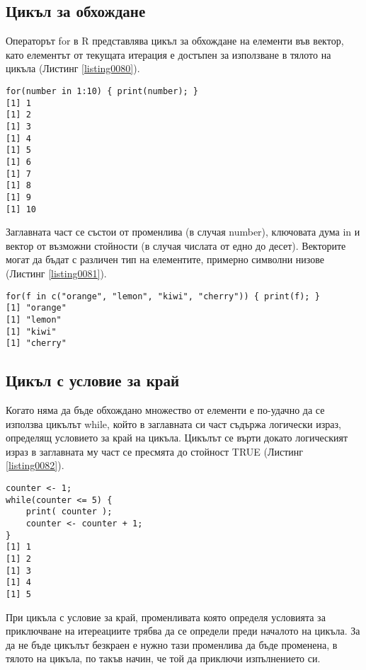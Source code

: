 \subsection{Цикъл за обхождане}

Операторът for в R представлява цикъл за обхождане на елементи във вектор, като елементът от текущата итерация е достъпен за използване в тялото на цикъла (Листинг \ref{listing0080}). 

\begin{lstlisting}[caption=Оператор за цикъл for, label=listing0080]
for(number in 1:10) { print(number); }
[1] 1
[1] 2
[1] 3
[1] 4
[1] 5
[1] 6
[1] 7
[1] 8
[1] 9
[1] 10
\end{lstlisting}

Заглавната част се състои от променлива (в случая number), ключовата дума in и вектор от възможни стойности (в случая числата от едно до десет). Векторите могат да бъдат с различен тип на елементите, примерно символни низове (Листинг \ref{listing0081}).

\begin{lstlisting}[caption=Обхождане на вектор от символни низове, label=listing0081]
for(f in c("orange", "lemon", "kiwi", "cherry")) { print(f); }
[1] "orange"
[1] "lemon"
[1] "kiwi"
[1] "cherry"
\end{lstlisting}

\subsection{Цикъл с условие за край}

Когато няма да бъде обхождано множество от елементи е по-удачно да се използва цикълът while, който в заглавната си част съдържа логически израз, определящ условието за край на цикъла. Цикълът се върти докато логическият израз в заглавната му част се пресмята до стойност TRUE (Листинг \ref{listing0082}). 

\begin{lstlisting}[caption=Цикъл с условие за край, label=listing0082]
counter <- 1;
while(counter <= 5) { 
	print( counter ); 
	counter <- counter + 1;
}
[1] 1
[1] 2
[1] 3
[1] 4
[1] 5
\end{lstlisting}

При цикъла с условие за край, променливата която определя условията за приключване на итереациите трябва да се определи преди началото на цикъла. За да не бъде цикълът безкраен е нужно тази променлива да бъде променена, в тялото на цикъла, по такъв начин, че той да приключи изпълнението си.

